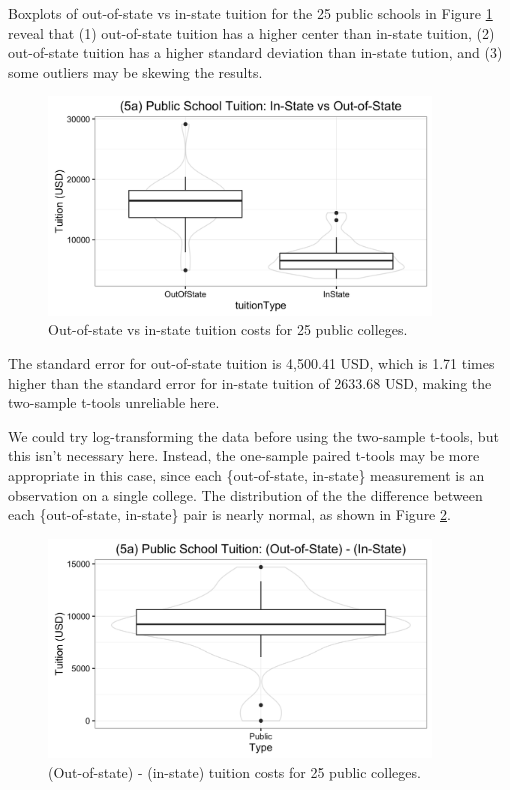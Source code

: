 \documentclass[11pt]{exam} %
\begin{document}
\begin{questions}
\begin{parts}
Boxplots of out-of-state vs in-state tuition for the 25 public schools in Figure \ref{fig:5a_twoSample} reveal that (1) out-of-state tuition has a higher center than in-state tuition, (2) out-of-state tuition has a higher standard deviation than in-state tution, and (3) some outliers may be skewing the results.
\begin{figure}
	\centering
	\includegraphics[width=4in]{5a_twoSample.png}
	\caption{Out-of-state vs in-state tuition costs for 25 public colleges.}
	\label{fig:5a_twoSample}
\end{figure}

The standard error for out-of-state tuition is 4,500.41 USD, which is 1.71 times higher than the standard error for in-state tuition of 2633.68 USD, making the two-sample t-tools unreliable here.

We could try log-transforming the data before using the two-sample t-tools, but this isn't necessary here. Instead, the one-sample paired t-tools may be more appropriate in this case, since each \{out-of-state, in-state\} measurement is an observation on a single college. The distribution of the the difference between each \{out-of-state, in-state\} pair is nearly normal, as shown in Figure \ref{fig:5a_paired}.
\begin{figure}
	\centering
	\includegraphics[width=4in]{5a_paired.png}
	\caption{(Out-of-state) - (in-state) tuition costs for 25 public colleges.}
	\label{fig:5a_paired}
\end{figure}


\end{parts}
\end{questions}
\end{document}
